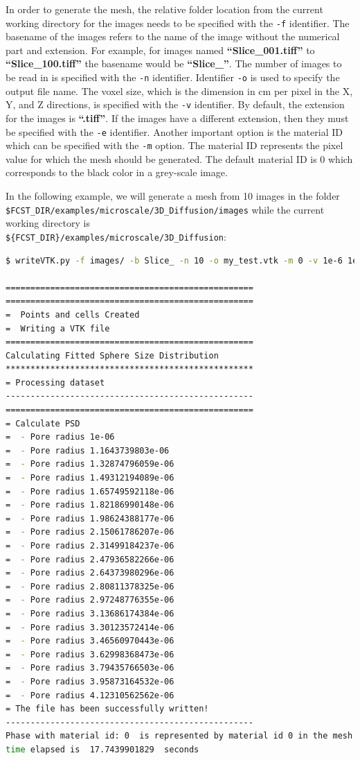 In order to generate the mesh, the relative folder location from the current working directory for the images needs to be specified with the \verb!-f! identifier. The basename of the images refers to the name of the image without the numerical part and extension. For example, for images named \textbf{``Slice\_001.tiff''} to \textbf{``Slice\_100.tiff''} the basename would be \textbf{``Slice\_''}. The number of images to be read in is specified with the \verb!-n! identifier. Identifier \verb!-o! is used to specify the output file name. The voxel size, which is the dimension in cm per pixel in the X, Y, and Z directions, is specified with the \verb!-v! identifier. By default, the extension for the images is \textbf{``.tiff''}. If the images have a different extension, then they must be specified with the \verb!-e! identifier. Another important option is the material ID which can be specified with the \verb!-m! option. The material ID represents the pixel value for which the mesh should be generated. The default material ID is 0 which corresponds to the black color in a grey-scale image.

In the following example, we will generate a mesh from 10 images in the folder\\
\texttt{\${FCST\_DIR}/examples/microscale/3D\_Diffusion/images} while the current working directory is\\
\verb!${FCST_DIR}/examples/microscale/3D_Diffusion!:

\begin{lstlisting}[language=bash]
$ writeVTK.py -f images/ -b Slice_ -n 10 -o my_test.vtk -m 0 -v 1e-6 1e-6 1e-6 -e .tiff

==================================================
==================================================
=  Points and cells Created
=  Writing a VTK file
==================================================
Calculating Fitted Sphere Size Distribution
**************************************************
= Processing dataset
--------------------------------------------------
==================================================
= Calculate PSD
=  - Pore radius 1e-06
=  - Pore radius 1.1643739803e-06
=  - Pore radius 1.32874796059e-06
=  - Pore radius 1.49312194089e-06
=  - Pore radius 1.65749592118e-06
=  - Pore radius 1.82186990148e-06
=  - Pore radius 1.98624388177e-06
=  - Pore radius 2.15061786207e-06
=  - Pore radius 2.31499184237e-06
=  - Pore radius 2.47936582266e-06
=  - Pore radius 2.64373980296e-06
=  - Pore radius 2.80811378325e-06
=  - Pore radius 2.97248776355e-06
=  - Pore radius 3.13686174384e-06
=  - Pore radius 3.30123572414e-06
=  - Pore radius 3.46560970443e-06
=  - Pore radius 3.62998368473e-06
=  - Pore radius 3.79435766503e-06
=  - Pore radius 3.95873164532e-06
=  - Pore radius 4.12310562562e-06
= The file has been successfully written!
--------------------------------------------------
Phase with material id: 0  is represented by material id 0 in the mesh file:  my_test.vtk
time elapsed is  17.7439901829  seconds
\end{lstlisting}

